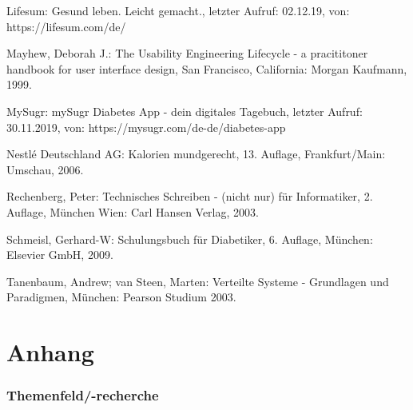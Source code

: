 \documentclass[a4paper,11pt]{article}%
\renewcommand{\\}{\vspace*{0.5\baselineskip} \newline}
\begin{document}
\begin{thebibliography}{1}
	Lifesum: Gesund leben. Leicht gemacht., letzter Aufruf: 02.12.19, von: \newline https://lifesum.com/de/
	
	
	Mayhew, Deborah J.: 
	The Usability Engineering Lifecycle - a pracititoner handbook for user interface design,
	San Francisco, California: Morgan Kaufmann,
	1999.
	
	MySugr:
	mySugr Diabetes App - dein digitales Tagebuch, letzter Aufruf: 30.11.2019, von:	
	https://mysugr.com/de-de/diabetes-app
	
	Nestlé Deutschland AG: 
	Kalorien mundgerecht, 13. Auflage, Frankfurt/Main: Umschau,
	2006.
	
	Rechenberg, Peter: 
	Technisches Schreiben - (nicht nur) für Informatiker, 2. Auflage,
	München Wien: Carl Hansen Verlag,
	2003.
	
	Schmeisl, Gerhard-W: 
	Schulungsbuch für Diabetiker, 6. Auflage, 
	München: Elsevier GmbH,
	2009.
	
	Tanenbaum, Andrew; van Steen, Marten: 
	Verteilte Systeme - Grundlagen und Paradigmen,
	München: Pearson Studium
	2003.
		
\end{thebibliography}
\newpage
\appendix
\vspace*{\fill}
\part*{Anhang}
\setcounter{section}{0}%
\setcounter{subsection}{0}%
\setcounter{figure}{0}
\renewcommand{\thesection}{\Alph{section}}
\renewcommand\thefigure{\Alph{section}\arabic{figure}}
\vfill
\newpage



\section{Themenfeld/-recherche}
\label{section:Themenfeld}
\end{document}
